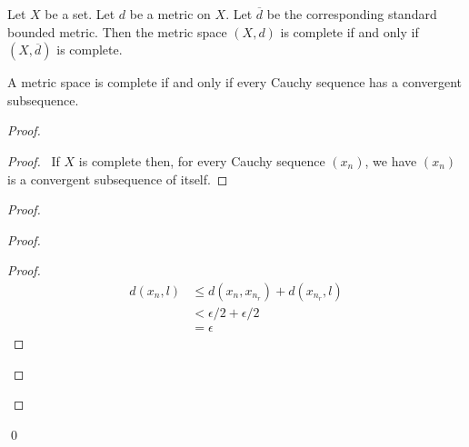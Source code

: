 \begin{corollary}
    Let $X$ be a set. Let $d$ be a metric on $X$. Let $\overline{d}$ be the corresponding
    standard bounded metric. Then the metric space $(X,d)$ is complete if and only if $(X,\overline{d})$
    is complete.
\end{corollary}

\begin{lemma}
    A metric space is complete if and only if every Cauchy sequence has a convergent subsequence.
\end{lemma}

\begin{proof}
    \pf
    \begin{proof}
        \pf\ If $X$ is complete then, for every Cauchy sequence $(x_n)$, we have $(x_n)$ is a convergent subsequence of itself.
    \end{proof}
    \begin{proof}
        \begin{proof}
            \begin{proof}
                \pf
                \begin{align*}
                    d(x_n,l) & \leq d(x_n,x_{n_r}) + d(x_{n_r},l) \\
                    & < \epsilon / 2 + \epsilon / 2 \\
                    & = \epsilon
                \end{align*}
            \end{proof}
        \end{proof}
    \end{proof}
    \qed
\end{proof}

